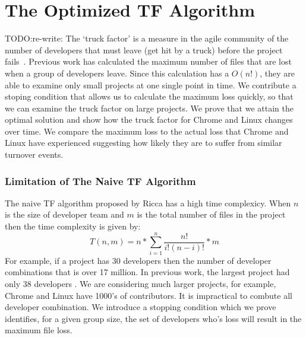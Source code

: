 \section{The Optimized TF Algorithm}
TODO:re-write: The `truck factor' is a measure in the agile community of the number of
developers that must leave (\eg get hit by a truck) before the project
fails~\cite{Torchiano2011Wetsom}. Previous work has calculated the maximum number of files
that are lost when a group of developers leave. Since this calculation has a
$O(n!)$, they are able to examine only small projects at one single point in time.
We contribute a stoping condition that allows us to calculate the maximum loss
quickly, so that we can examine the truck factor on large projects. We prove
that we attain the optimal solution and show how the truck factor for Chrome and
Linux changes over time. We compare the maximum loss to the actual loss that
Chrome and Linux have experienced suggesting how likely they are to suffer from
similar turnover events.
\subsubsection{Limitation of The Naive TF Algorithm}
The naive TF algorithm proposed by Ricca \etal \cite{Ricca2011PROFES} has a high time complexicy.
When $n$ is the size of developer team and $m$ is the total number of files in the project then the time complexity is given by:
\begin{equation}T(n,m) = n*\sum_{i=1}^n \frac{n!}{i!(n-i)!}*m\end{equation}
For example, if a project has 30 developers then the number of developer combinations that is over 17 million.
In previous work, the largest project had only 38 developers
\cite{Torchiano2011Wetsom}. We are considering much larger projects, for
example, Chrome and Linux have 1000's of contributors. It is impractical to
combute all developer combination.
We introduce a stopping condition which we prove identifies, for a given group size, the set of developers who's loss will result in the maximum file loss.
